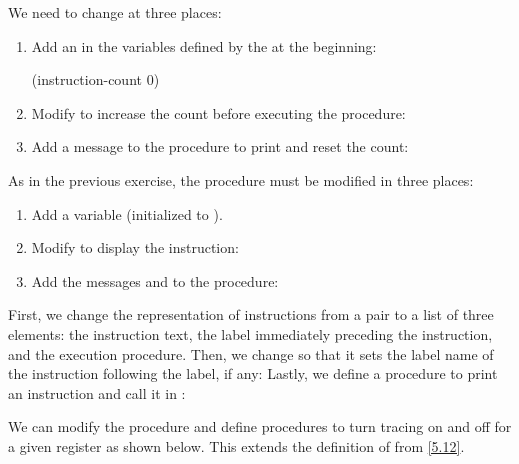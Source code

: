 \begin{exe}[5.15]
    We need to change  at three places:
    \begin{enumerate}[label=\arabic*.]
	\item Add an  in the variables defined by the 
	     at the beginning:
	    \begin{cscm}
		(instruction-count 0)
	    \end{cscm}

	\item Modify  to increase the count before executing the 
	    procedure:

	\item Add a message to the  procedure to print and reset 
	    the count:
    \end{enumerate}
\end{exe}

\begin{exe}[5.16]
    As in the previous exercise, the  procedure must be 
    modified in three places:
    \begin{enumerate}[label=\arabic*.]
	\item Add a  variable (initialized to ).
	\item Modify  to display the instruction:
	\item Add the messages  and  to the 
	     procedure:
    \end{enumerate}
\end{exe}

\begin{exe}[5.17]
    \label{5.17}
    First, we change the representation of instructions from a pair to a list of 
    three elements: the instruction text, the label immediately preceding the 
    instruction, and the execution procedure.
    Then, we change  so that it sets the label name of 
    the instruction following the label, if any:
    Lastly, we define a procedure to print an instruction and call it in 
    :
\end{exe}

\begin{exe}[5.18]
    We can modify the  procedure and define procedures to 
    turn tracing on and off for a given register as shown below. This extends 
    the definition of  from \autoref{5.12}.
\end{exe}

